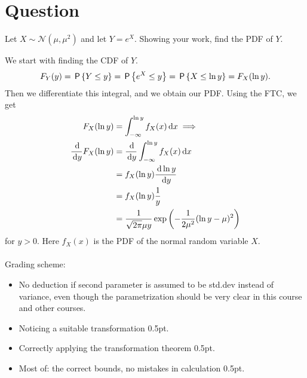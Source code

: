 \section{Question}

\begin{exercise}[1.5]
Let $X\sim\mathcal{N}(\mu,\mu^2)$ and let $Y = e^X$. Showing your work, find the PDF of $Y$.
\begin{solution}
We start with finding the CDF of $Y$.
\begin{align*}
    F_Y(y) = \P{Y\leq y} = \P{e^X\leq y} = \P{X\leq \ln{y}} = F_X(\ln{y}).
\end{align*}
Then we differentiate this integral, and we obtain our PDF. Using the FTC, we get
\begin{align*}
    F_X(\ln{y}) &= \int_{-\infty}^{\ln{y}}{f_X(x)\d x}\implies\\
    \frac{\d }{\d y}F_X(\ln{y}) &= \frac{\d }{\d y}\int_{-\infty}^{\ln{y}}{f_X(x)\d x}\\
    &= f_X(\ln{y})\frac{\d \ln{y}}{\d y}\\
    &= f_X(\ln{y})\frac1 y\\
    &= \frac{1}{\sqrt{2\pi}\mu y}\exp{\left(-\frac{1}{2\mu^2}(\ln{y}-\mu)^2\right)}
\end{align*}
for $y>0$. Here $f_X(x)$ is the PDF of the normal random variable $X$.
\\\\
Grading scheme:
\begin{itemize}
    \item No deduction if second parameter is assumed to be std.dev instead of variance, even though the parametrization should be very clear in this course and other courses.
    \item Noticing a suitable transformation 0.5pt.
    \item Correctly applying the transformation theorem 0.5pt.
    \item Most of: the correct bounds, no mistakes in calculation 0.5pt.
\end{itemize}
\end{solution}
\end{exercise}

